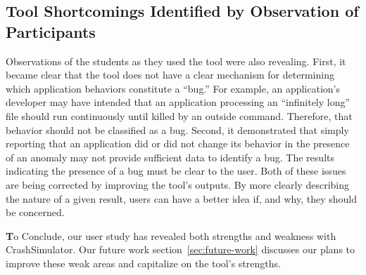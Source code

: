 \subsection{Tool Shortcomings Identified by Observation of Participants}
\label{subsec:tool-shortcomings}
Observations of the students as they used the tool were also revealing.
First,
it became clear that the tool
does not have a clear mechanism
for determining
which application behaviors constitute a ``bug.''
For example, an application's developer
may have intended that an application processing an ``infinitely long'' file should run continuously
until killed by an outside command.
Therefore, that behavior should not be classified as a bug.
Second,
it demonstrated that
simply reporting that an application did or did not change its behavior
in the presence of an anomaly may not provide sufficient data to identify a bug. The results indicating the presence of a bug must be clear to the user.
Both of these issues are being corrected
by improving the tool's outputs.
By more clearly describing
the nature of a given result,
users can have a better idea
if,
and why,
they should be concerned.

{\textbf To Conclude}, our user study has revealed both strengths and weakness
with CrashSimulator.  Our future work section~\ref{sec:future-work}
discusses our plans to improve
these weak areas and capitalize on the tool's strengths.
